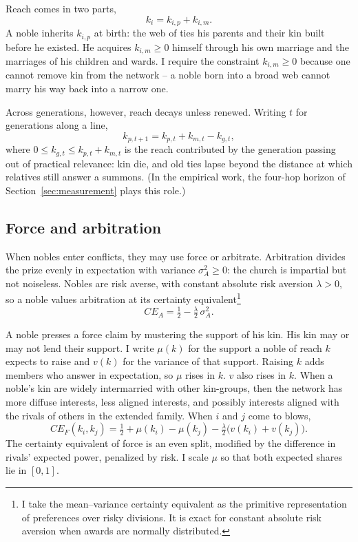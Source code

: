 \documentclass[12pt]{article}
\theoremstyle{definition}
\theoremstyle{remark}
\begin{document}
Reach comes in two parts,
\begin{equation}\label{eq:decomp}
k_i = k_{i,p} + k_{i,m}.
\end{equation}
A noble inherits $k_{i,p}$ at birth: the web of ties his parents and their kin built before he existed. He acquires $k_{i,m}\ge 0$ himself through his own marriage and the marriages of his children and wards. I require the constraint $k_{i,m}\ge 0$ because one cannot remove kin from the network -- a noble born into a broad web cannot marry his way back into a narrow one.

Across generations, however, reach decays unless renewed. Writing $t$ for generations along a line,
\begin{equation}\label{eq:bequest}
k_{p,t+1} = k_{p,t} + k_{m,t} - k_{g,t},
\end{equation}
where $0\le k_{g,t}\le k_{p,t}+k_{m,t}$ is the reach contributed by the generation passing out of practical relevance: kin die, and old ties lapse beyond the distance at which relatives still answer a summons. (In the empirical work, the four-hop horizon of Section~\ref{sec:measurement} plays this role.)

\subsection{Force and arbitration}

When nobles enter conflicts, they may use force or arbitrate. Arbitration divides the prize evenly in expectation with variance $\sigma^2_A\ge 0$: the church is impartial but not noiseless. Nobles are risk averse, with constant absolute risk aversion $\lambda>0$, so a noble values arbitration at its certainty equivalent\footnote{I take the mean--variance certainty equivalent as the primitive representation of preferences over risky divisions. It is exact for constant absolute risk aversion when awards are normally distributed.}
\begin{equation}\label{eq:cea}
CE_A=\tfrac12-\tfrac{\lambda}{2}\,\sigma^2_A .
\end{equation}

A noble presses a force claim by mustering the support of his kin. His kin may or may not lend their support. I write $\mu(k)$ for the support a noble of reach $k$ expects to raise and $v(k)$ for the variance of that support. Raising $k$ adds members who answer in expectation, so $\mu$ rises in $k$. $v$ also rises in $k$. When a noble's kin are widely intermarried with other kin-groups, then the network has more diffuse interests, less aligned interests, and possibly interests aligned with the rivals of others in the extended family. When $i$ and $j$ come to blows,
\begin{equation}\label{eq:cef}
CE_F(k_i,k_j)=\tfrac12+\mu(k_i)-\mu(k_j)-\tfrac{\lambda}{2}\bigl(v(k_i)+v(k_j)\bigr).
\end{equation}
The certainty equivalent of force is an even split, modified by the difference in rivals' expected power, penalized by risk. I scale $\mu$ so that both expected shares lie in $[0,1]$.
\end{document}
